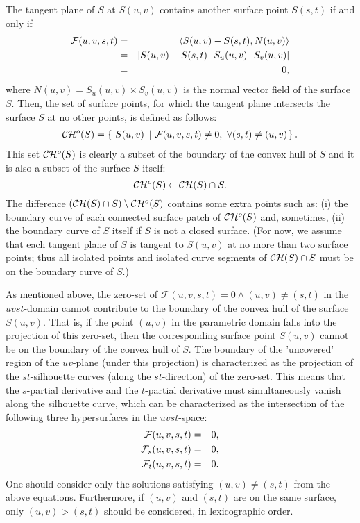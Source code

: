 \documentclass{elsart}
\begin{document}
The tangent plane of $S$ at $S(u,v)$ contains
another surface point $S(s,t)$ if and only if 
\begin{eqnarray*}
   {\mathcal F}(u,v,s,t) &=& \inner{S(u,v)-S(s,t)}{N(u,v)}\\
   &=& |S(u,v)-S(s,t)\ \ S_u(u,v)\ \ S_v(u,v)|\\
   &=& 0,
\end{eqnarray*}
where $N(u,v) = S_u(u,v) \times S_v(u,v)$ is the normal vector field 
of the surface $S$. Then, the set of surface points, for which 
the tangent plane intersects the surface $S$ at no other points, 
is defined as follows:
\begin{eqnarray*}
\CH{}^o(S) = \left\{~S(u,v)~\left|~ 
{\cal F}(u,v,s,t) \neq 0,~\forall (s,t) \neq (u,v) \right. \right\}.
\end{eqnarray*}
This set $\CH{}^o(S)$ is clearly a subset of the boundary of the convex hull
of $S$ and it is also a subset of the surface $S$ itself:
\begin{equation}
    \CH{}^o(S) \subset \CH{}(S) \cap S.
\label{eqn-cho-ch}
\end{equation}
The difference $(\CH{}(S) \cap S) \setminus \CH{}^o(S)$ contains some extra
points such as: (i) the boundary curve of each connected surface patch of
$\CH{}^o(S)$ and, sometimes, (ii) the boundary curve of $S$ itself if $S$ is 
not a closed surface.  (For now, we assume that each tangent plane of $S$ is
tangent to $S(u,v)$ at no more than two surface points;
thus all isolated points and isolated curve segments of
$\CH{}(S) \cap S$ must be on the boundary curve of $S$.)

As mentioned above, the zero-set of 
${\mathcal F}(u,v,s,t) = 0 \wedge (u,v) \neq (s,t)$ in
the $uvst$-domain cannot contribute to the boundary of the convex hull
of the surface $S(u,v)$. That is, if the point $(u,v)$ in the parametric
domain falls into the projection of this zero-set, then the corresponding
surface point $S(u,v)$ cannot be on the boundary of the convex hull 
of $S$. The boundary of the 'uncovered' region of the $uv$-plane
(under this projection) is characterized as the projection of the 
$st$-silhouette curves (along the $st$-direction) of the zero-set. This means
that the $s$-partial derivative and the $t$-partial derivative must 
simultaneously vanish along the silhouette curve, which can be 
characterized as the
intersection of the following three hypersurfaces in the $uvst$-space:
\begin{eqnarray}
   {\cal F}(u,v,s,t) &=& 0, \label{eqn-f-uvst} \\
   {\cal F}_s(u,v,s,t) &=& 0, \label{eqn-s-partial}\\
   {\cal F}_t(u,v,s,t) &=& 0. \label{eqn-t-partial}
\end{eqnarray}
One should consider only the solutions satisfying $(u,v) \neq (s,t)$
from the above equations. Furthermore, if $(u,v)$ and $(s,t)$ are
on the same surface, only $(u,v) > (s,t)$ should be considered, in
lexicographic order.
\end{document}
